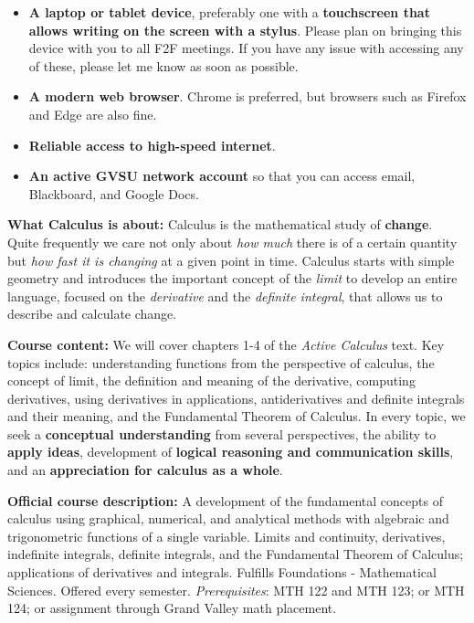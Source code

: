 \documentclass[]{article}
\providecommand{\tightlist}{%
  \setlength{\itemsep}{0pt}\setlength{\parskip}{0pt}}
\begin{document}
\begin{itemize}
\tightlist
\item
  \textbf{A laptop or tablet device}, preferably one with a
  \textbf{touchscreen that allows writing on the screen with a stylus}.
  Please plan on bringing this device with you to all F2F meetings. If you have any issue with accessing any of these, please let me know as soon as possible.
\item
  \textbf{A modern web browser}. Chrome is preferred, but browsers such
  as Firefox and Edge are also fine.
\item
  \textbf{Reliable access to high-speed internet}.
\item
  \textbf{An active GVSU network account} so that you can access email,
  Blackboard, and Google Docs.
\end{itemize}



\textbf{What Calculus is about:} Calculus is the mathematical study of
\textbf{change}. Quite frequently we care not only about \emph{how much}
there is of a certain quantity but \emph{how fast it is changing} at a
given point in time. Calculus starts with simple geometry and introduces
the important concept of the \emph{limit} to develop an entire language,
focused on the \emph{derivative} and the \emph{definite integral}, that
allows us to describe and calculate change.

\textbf{Course content:} We will cover chapters 1-4 of the \emph{Active
Calculus} text. Key topics include: understanding functions from the
perspective of calculus, the concept of limit, the definition and
meaning of the derivative, computing derivatives, using derivatives in
applications, antiderivatives and definite integrals and their meaning,
and the Fundamental Theorem of Calculus. In every topic, we seek a
\textbf{conceptual understanding} from several perspectives, the ability
to \textbf{apply ideas}, development of \textbf{logical reasoning and
communication skills}, and an \textbf{appreciation for calculus as a
whole}.

\textbf{Official course description:} A development of the fundamental
concepts of calculus using graphical, numerical, and analytical methods
with algebraic and trigonometric functions of a single variable. Limits
and continuity, derivatives, indefinite integrals, definite integrals,
and the Fundamental Theorem of Calculus; applications of derivatives and
integrals. Fulfills Foundations - Mathematical Sciences. Offered every
semester. \emph{Prerequisites}: MTH 122 and MTH 123; or MTH 124; or
assignment through Grand Valley math placement.
\end{document}
